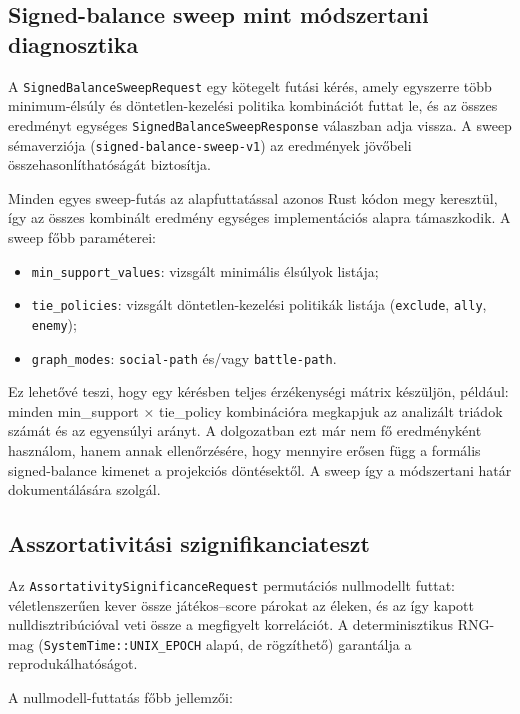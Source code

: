 ﻿\documentclass[a4paper,12pt]{report}
\begin{document}
\subsection{Signed-balance sweep mint módszertani diagnosztika}

A \texttt{SignedBalanceSweepRequest} egy kötegelt futási kérés, amely egyszerre több minimum-élsúly és döntetlen-kezelési politika kombinációt futtat le, és az összes eredményt egységes \texttt{SignedBalanceSweepResponse} válaszban adja vissza. A sweep sémaverziója (\texttt{signed-balance-sweep-v1}) az eredmények jövőbeli összehasonlíthatóságát biztosítja.

Minden egyes sweep-futás az alapfuttatással azonos Rust kódon megy keresztül, így az összes kombinált eredmény egységes implementációs alapra támaszkodik. A sweep főbb paraméterei:

\begin{itemize}
    \item \texttt{min\_support\_values}: vizsgált minimális élsúlyok listája;
    \item \texttt{tie\_policies}: vizsgált döntetlen-kezelési politikák listája (\texttt{exclude}, \texttt{ally}, \texttt{enemy});
    \item \texttt{graph\_modes}: \texttt{social-path} és/vagy \texttt{battle-path}.
\end{itemize}

Ez lehetővé teszi, hogy egy kérésben teljes érzékenységi mátrix készüljön, például: minden min\_support × tie\_policy kombinációra megkapjuk az analizált triádok számát és az egyensúlyi arányt. A dolgozatban ezt már nem fő eredményként használom, hanem annak ellenőrzésére, hogy mennyire erősen függ a formális signed-balance kimenet a projekciós döntésektől. A sweep így a módszertani határ dokumentálására szolgál.

\subsection{Asszortativitási szignifikanciateszt}

Az \texttt{AssortativitySignificanceRequest} permutációs nullmodellt futtat: véletlenszerűen kever össze játékos--score párokat az éleken, és az így kapott nulldisztribúcióval veti össze a megfigyelt korrelációt. A determinisztikus RNG-mag (\texttt{SystemTime::UNIX\_EPOCH} alapú, de rögzíthető) garantálja a reprodukálhatóságot.

A nullmodell-futtatás főbb jellemzői:
\end{document}
